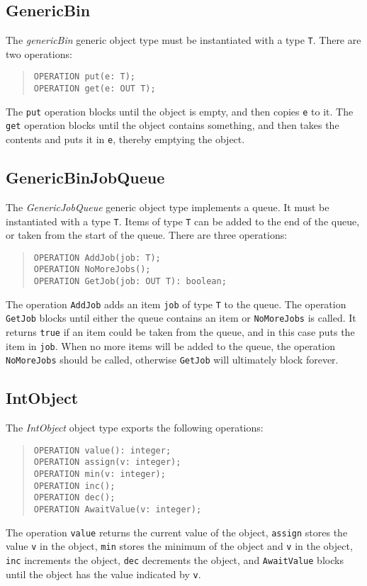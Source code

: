 \documentclass[10pt]{article}
\begin{document}
\subsection{GenericBin}

The {\em genericBin} generic object type must be instantiated with a type \verb+T+.
There are two operations:
\begin{quote}
\begin{verbatim}
OPERATION put(e: T);
OPERATION get(e: OUT T);
\end{verbatim}
\end{quote}
The \verb+put+ operation blocks until the object is empty, and then copies
\verb+e+ to it.
The \verb+get+ operation blocks until the object contains something, and
then takes the contents and puts it in \verb+e+, thereby emptying the
object.

\subsection{GenericBinJobQueue}

The {\em GenericJobQueue} generic object type implements a queue.
It must be instantiated with a type \verb+T+.
Items of type \verb+T+ can be added to the end of the queue, or taken
from the start of the queue.
There are three operations:
\begin{quote}
\begin{verbatim}
OPERATION AddJob(job: T);
OPERATION NoMoreJobs();
OPERATION GetJob(job: OUT T): boolean;
\end{verbatim}
\end{quote}
The operation \verb+AddJob+ adds an item \verb+job+ of type \verb+T+
to the queue.
The operation \verb+GetJob+ blocks until either the queue contains an
item or \verb+NoMoreJobs+ is called.
It returns \verb+true+ if an item could be taken from the queue,
and in this case puts the item in \verb+job+.
When no more items will be added to the queue, the operation \verb+NoMoreJobs+
should be called, otherwise \verb+GetJob+ will ultimately block forever.


\subsection{IntObject}

The {\em IntObject} object type exports the following operations:
\begin{quote}
\begin{verbatim}
OPERATION value(): integer;
OPERATION assign(v: integer);
OPERATION min(v: integer);
OPERATION inc();
OPERATION dec();
OPERATION AwaitValue(v: integer);
\end{verbatim}
\end{quote}
The operation \verb+value+ returns the current value of the
object, \verb+assign+ stores the value \verb+v+ in the object, \verb+min+
stores the minimum of the object and \verb+v+ in the object, \verb+inc+
increments the object, \verb+dec+ decrements the object, and \verb+AwaitValue+
blocks until the object has the value indicated by \verb+v+.
\end{document}
